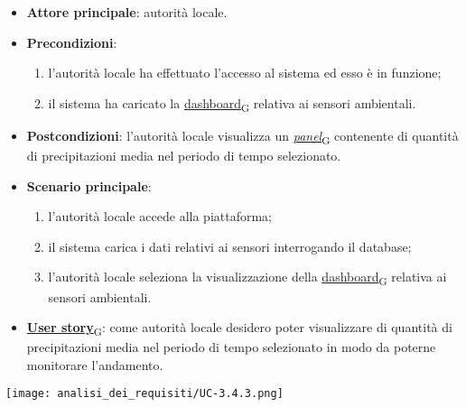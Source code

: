 \begin{itemize}
	\item \textbf{Attore principale}: autorità locale.
	\item \textbf{Precondizioni}:
	      \begin{enumerate}
		      \item l'autorità locale ha effettuato l'accesso al sistema ed esso è in funzione;
		      \item il sistema ha caricato la \href{https://7last.github.io/docs/pb/documentazione-interna/glossario\#dashboard}{dashboard\textsubscript{G}} relativa ai sensori ambientali.
	      \end{enumerate}
	\item \textbf{Postcondizioni}: l'autorità locale visualizza un \href{https://7last.github.io/docs/pb/documentazione-interna/glossario\#panel}{\textit{panel}\textsubscript{G}} contenente di quantità di precipitazioni media nel periodo di tempo selezionato.
	\item \textbf{Scenario principale}:
	      \begin{enumerate}
		      \item l'autorità locale accede alla piattaforma;
		      \item il sistema carica i dati relativi ai sensori interrogando il database;
		      \item l'autorità locale seleziona la visualizzazione della \href{https://7last.github.io/docs/pb/documentazione-interna/glossario\#dashboard}{dashboard\textsubscript{G}} relativa ai sensori ambientali.
	      \end{enumerate}
	\item \href{https://7last.github.io/docs/pb/documentazione-interna/glossario\#user-story}{\textbf{User story}\textsubscript{G}}: come autorità locale desidero poter visualizzare di quantità di precipitazioni media nel periodo di tempo selezionato
	      in modo da poterne monitorare l'andamento.
\end{itemize}
\begin{center}
	\texttt{[image: analisi\_dei\_requisiti/UC-3.4.3.png]}
\end{center}



